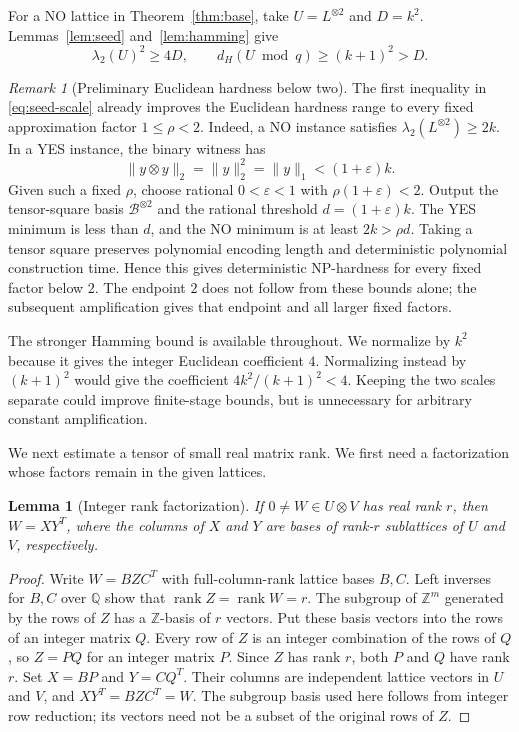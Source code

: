 \documentclass[11pt,letterpaper]{article}
\numberwithin{equation}{section}
\newtheorem{lemma}[theorem]{Lemma}
\theoremstyle{definition}
\theoremstyle{remark}
\newtheorem*{remark*}{Remark}
\DeclareMathOperator{\rank}{rank}
\newcommand{\Z}{\mathbb Z}
\newcommand{\cB}{\mathcal B}
\begin{document}
For a NO lattice in Theorem~\ref{thm:base}, take $U=L^{\otimes2}$ and $D=k^2$. Lemmas~\ref{lem:seed} and~\ref{lem:hamming} give
\begin{equation}\label{eq:seed-scale}
 \lambda_2(U)^2\ge4D,
 \qquad d_H(U\bmod q)\ge(k+1)^2>D.
\end{equation}
\begin{remark*}[Preliminary Euclidean hardness below two]
The first inequality in \eqref{eq:seed-scale} already improves the Euclidean hardness range to every fixed approximation factor $1\le\rho<2$. Indeed, a NO instance satisfies $\lambda_2(L^{\otimes2})\ge2k$. In a YES instance, the binary witness has
\[
 \|y\otimes y\|_2=\|y\|_2^2=\|y\|_1<(1+\varepsilon)k.
\]
Given such a fixed $\rho$, choose rational $0<\varepsilon<1$ with $\rho(1+\varepsilon)<2$. Output the tensor-square basis $\cB^{\otimes2}$ and the rational threshold $d=(1+\varepsilon)k$. The YES minimum is less than $d$, and the NO minimum is at least $2k>\rho d$. Taking a tensor square preserves polynomial encoding length and deterministic polynomial construction time. Hence this gives deterministic NP-hardness for every fixed factor below $2$. The endpoint $2$ does not follow from these bounds alone; the subsequent amplification gives that endpoint and all larger fixed factors.
\end{remark*}
The stronger Hamming bound is available throughout. We normalize by $k^2$ because it gives the integer Euclidean coefficient $4$. Normalizing instead by $(k+1)^2$ would give the coefficient $4k^2/(k+1)^2<4$. Keeping the two scales separate could improve finite-stage bounds, but is unnecessary for arbitrary constant amplification.

We next estimate a tensor of small real matrix rank. We first need a factorization whose factors remain in the given lattices.

\begin{lemma}[Integer rank factorization]\label{lem:factorization}
If $0\ne W\in U\otimes V$ has real rank $r$, then $W=XY^T$, where the columns of $X$ and $Y$ are bases of rank-$r$ sublattices of $U$ and $V$, respectively.
\end{lemma}
\begin{proof}
Write $W=BZC^T$ with full-column-rank lattice bases $B,C$. Left inverses for $B,C$ over $\mathbb Q$ show that $\rank Z=\rank W=r$. The subgroup of $\Z^m$ generated by the rows of $Z$ has a $\Z$-basis of $r$ vectors. Put these basis vectors into the rows of an integer matrix $Q$. Every row of $Z$ is an integer combination of the rows of $Q$, so $Z=PQ$ for an integer matrix $P$. Since $Z$ has rank $r$, both $P$ and $Q$ have rank $r$. Set $X=BP$ and $Y=CQ^T$. Their columns are independent lattice vectors in $U$ and $V$, and $XY^T=BZC^T=W$. The subgroup basis used here follows from integer row reduction; its vectors need not be a subset of the original rows of $Z$.
\end{proof}
\end{document}
